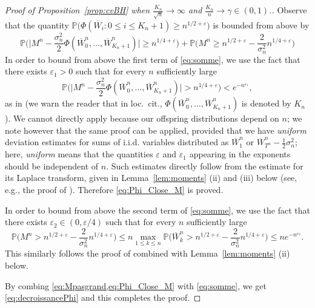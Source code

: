 \documentclass[AHL,XML,longabstracts,Unicode]{cedram}
\renewcommand{\P}{\mathbb{P}}
\def\eps{\varepsilon}
\renewcommand{\epsilon}{\varepsilon}
\begin{document}
\begin{proof}[Proof of  Proposition~\ref{prop:cvBH}  when $\tfrac{K_{n}}{\sqrt{n}} \rightarrow \infty$ and $ \tfrac{K_{n}}{n}  \rightarrow \gamma \in (0,1)$.]
Observe that the quantity $ \P\big(\Phi( \overline{W}_{i} :0 \leq i \leq K_{n}+1) \geq n^{1/2+\epsilon}
  \big) $ is bounded from above by
\begin{equation}
\label{eq:somme} \P\bigg( \big|M^n-\frac{\sigma_n^2}{2}\Phi(\overline{W}^{n}_0,\dots,\overline{W}^{n}_{K_n+1})\big|
  \geq n^{1/4+\eps} \bigg) + \P\bigg( M^n  \geq n^{1/2+\eps}- \frac{2}{\sigma_{n}^{2}} n^{1/4+\epsilon} \bigg)
\end{equation}
In order to bound from above the first term of \eqref{eq:somme}, we use the fact that there exists $\epsilon_{1}>0$ such that for every $n$ sufficiently large
\begin{equation}
  \P\bigg( \big|M^n-\frac{\sigma_n^2}{2}\Phi(\overline{W}^{n}_0,\dots,\overline{W}^{n}_{K_n+1})\big|
  >n^{1/4+\eps} \bigg) < e^{-n^{\eps_{1}}},
\label{eq:Phi_Close_M}
\end{equation}
as in \cite[Lemma 1.11]{LG05} (we warn the reader that in loc.\ cit.,
$\Phi(\overline{W}^{n}_0,\dots,\overline{W}^{n}_{K_n+1})$ is denoted by $K_n$).
We cannot directly apply \cite[Lemma 1.11]{LG05} because our offspring distributions depend on $n$;
we note however that the same proof can be applied,
provided that we have {\em uniform} deviation estimates for sums of i.i.d. variables
distributed as $\overline{W}^{n}_{1}$ or $\overline{W}^{n}_{T^n}-\tfrac12 \sigma_n^2$;
here, {\em uniform} means that the quantities $\eps$ and $\eps_{1}$ appearing
in the exponents should be independent of $n$.
Such estimates directly follow from the estimate for its Laplace transform,
given in Lemma~\ref{lem:moments} (ii) and (iii) below (see, e.g., the proof of \cite[Lemma 1.12]{LG05}).
Therefore \eqref{eq:Phi_Close_M} is proved.

In order to bound from above the second term of \eqref{eq:somme}, we use the fact that there exists $\epsilon_{2} \in (0,\epsilon/4)$ such that for every $n$ sufficiently large
\begin{equation}
\label{eq:Mpasgrand}
\P\bigg( M^n  >n^{1/2+\eps}- \frac{2}{\sigma_{n}^{2}} n^{1/4+\epsilon} \bigg) \leq  n \max_{1 \leq k \leq n} \P\bigg( \overline{W}^{n}_{k}>n^{1/2+\eps}- \frac{2}{\sigma_{n}^{2}} n^{1/4+\epsilon} \bigg) \leq n e^{-n^{\epsilon_{2}}}.
\end{equation}This similarly follows the proof of \cite[Lemma 1.12]{LG05} combined with Lemma~\ref{lem:moments} (ii) below.

By combing \cref{eq:Mpasgrand,eq:Phi_Close_M} with \eqref{eq:somme}, we get \eqref{eq:decroissancePhi} and this completes the proof.
\end{proof}
\end{document}
